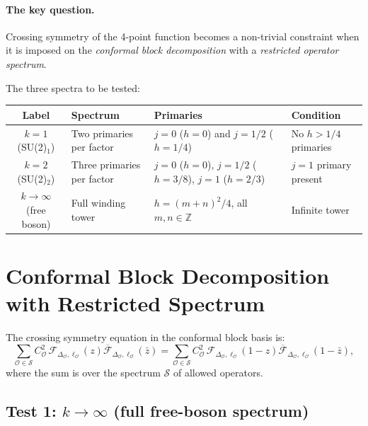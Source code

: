 \documentclass[12pt,a4paper]{article}
\theoremstyle{definition}
\theoremstyle{remark}
\begin{document}
\paragraph{The key question.}
Crossing symmetry of the 4-point function becomes a non-trivial constraint
when it is imposed on the \emph{conformal block decomposition} with a
\emph{restricted operator spectrum}.

\medskip
The three spectra to be tested:

\begin{center}
\renewcommand{\arraystretch}{1.3}
\begin{tabular}{clll}
\toprule
Label & Spectrum & Primaries & Condition \\
\midrule
$k = 1$ (SU(2)$_1$) & Two primaries per factor &
  $j = 0$ ($h=0$) and $j = 1/2$ ($h=1/4$) &
  No $h > 1/4$ primaries \\
$k = 2$ (SU(2)$_2$) & Three primaries per factor &
  $j = 0$ ($h=0$), $j=1/2$ ($h=3/8$), $j=1$ ($h=2/3$) &
  $j=1$ primary present \\
$k \to \infty$ (free boson) & Full winding tower &
  $h = (m+n)^2/4$, all $m,n \in \mathbb{Z}$ &
  Infinite tower \\
\bottomrule
\end{tabular}
\end{center}

\section{Conformal Block Decomposition with Restricted Spectrum}
\label{sec:m3:blocks}

The crossing symmetry equation in the conformal block basis is:
\begin{equation}
  \sum_{\mathcal{O} \in \mathcal{S}} C_{\mathcal{O}}^2\,
  \mathcal{F}_{\Delta_{\mathcal{O}}, \ell_{\mathcal{O}}}(z)
  \overline{\mathcal{F}}_{\Delta_{\mathcal{O}}, \ell_{\mathcal{O}}}(\bar{z})
  =
  \sum_{\mathcal{O} \in \mathcal{S}} C_{\mathcal{O}}^2\,
  \mathcal{F}_{\Delta_{\mathcal{O}}, \ell_{\mathcal{O}}}(1-z)
  \overline{\mathcal{F}}_{\Delta_{\mathcal{O}}, \ell_{\mathcal{O}}}(1-\bar{z}),
  \label{eq:m3:crossing_blocks}
\end{equation}
where the sum is over the spectrum $\mathcal{S}$ of allowed operators.

\subsection{Test 1: $k \to \infty$ (full free-boson spectrum)}
\end{document}
